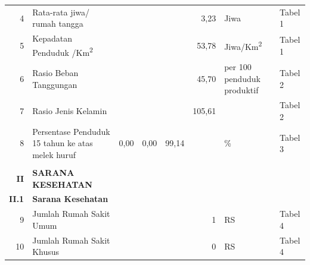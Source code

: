\begin{small}
\begin{longtable}{rY{12em}rrrrY{5em}Y{5em}}
	  4 & Rata-rata jiwa/ rumah tangga                                                                            &        &        &         &               3,23 & Jiwa                           & Tabel 1  \\
	                    5 & Kepadatan Penduduk /Km\textsuperscript{2}                                                               &        &        &         &              53,78 & Jiwa/Km\textsuperscript{2}     & Tabel 1  \\
	  6 & Rasio Beban Tanggungan                                                                                  &        &        &         &              45,70 & per 100 penduduk produktif     & Tabel 2  \\
	                    7 & Rasio Jenis Kelamin                                                                                     &        &        &         &             105,61 &                                & Tabel 2  \\
	  8 & Persentase Penduduk 15 tahun ke atas melek huruf                                                        &   0,00 &   0,00 &   99,14 &                    & \%                             & Tabel 3  \\
	                      &                                                                                                         &        &        &         &                    &                                &          \\
	          \textbf{II} & \textbf{SARANA KESEHATAN}                                                                               &        &        &         &                    &                                &          \\
	        \textbf{II.1} & \textbf{Sarana Kesehatan}                                                                               &        &        &         &                    &                                &          \\
	                    9 & Jumlah Rumah Sakit Umum                                                                                 &        &        &         &                  1 & RS                             & Tabel 4  \\
	 10 & Jumlah Rumah Sakit Khusus                                                                               &        &        &         &                  0 & RS                             & Tabel 4  \\

\end{longtable}
\end{small}
